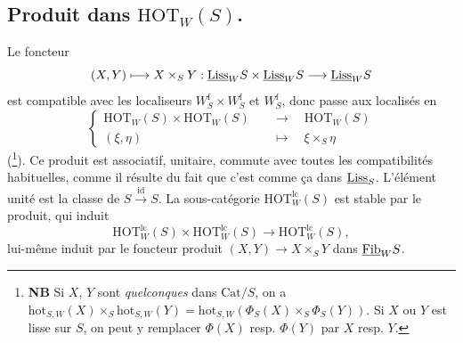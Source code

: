 \subsection*{ Produit dans $\mathrm{HOT}_W(S)$.}

Le foncteur
\[
(X, Y) \longmapsto X \times_S Y : \underline{\mathrm{Liss}}_W S \times \underline{\mathrm{Liss}}_W S \longrightarrow \underline{\mathrm{Liss}}_W S
\]
est compatible avec les localiseurs $W_S^{\mathrm{f}} \times W_S^{\mathrm{f}}$ et $W_S^{\mathrm{f}}$, donc passe aux localisés en
\[
\left\{
\begin{aligned}
\mathrm{HOT}_W(S) \times \mathrm{HOT}_W(S) &\quad\longrightarrow\quad \mathrm{HOT}_W(S)\\
(\xi, \eta) &\quad\longmapsto\quad \xi \times_S \eta
\end{aligned}
\right.
\]
(\footnote[97]{\textbf{NB} Si $X$, $Y$ sont \textit{quelconques} dans $\mathrm{Cat}/S$, on a $\mathrm{hot}_{S,W}(X) \times_S \mathrm{hot}_{S,W}(Y) = \mathrm{hot}_{S,W}(\Phi_S(X) \times_S \Phi_S(Y))$. Si $X$ ou $Y$ est lisse sur $S$, on peut y remplacer $\Phi(X)$ resp. $\Phi(Y)$ par $X$ resp. $Y$.}). Ce produit est associatif, unitaire, commute avec toutes les compatibilités habituelles, comme il résulte du fait que c'est comme ça dans $\underline{\mathrm{Liss}}_S$. L'élément unité est la classe de $S \xrightarrow{\mathrm{id}} S$. La sous-catégorie $\mathrm{HOT}^{\mathrm{lc}}_W(S)$ est stable par le produit, qui induit
\[
\mathrm{HOT}^{\mathrm{lc}}_W(S) \times \mathrm{HOT}^{\mathrm{lc}}_W(S) \longrightarrow \mathrm{HOT}^{\mathrm{lc}}_W(S),
\]
lui-même induit par le foncteur produit $(X, Y) \longrightarrow X \times_S Y$ dans $\underline{\mathrm{Fib}}_W S$.


